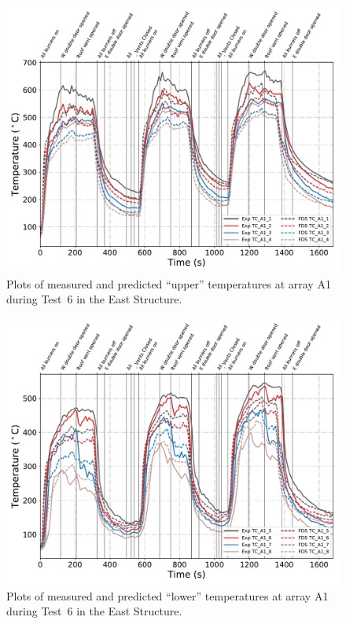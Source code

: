 \clearpage
\begin{figure}[p]
	\centering
	\includegraphics[width=\columnwidth]{Figures/Plots/Validation/Temperature/Test_6_TC_A1_upper}
	\caption{Plots of measured and predicted ``upper'' temperatures at array A1 during Test~6 in the East Structure.}
	\label{fig:TCA1_upper_data_Test6}
\end{figure}
\begin{figure}[p]
	\centering
	\includegraphics[width=\columnwidth]{Figures/Plots/Validation/Temperature/Test_6_TC_A1_lower}
	\caption{Plots of measured and predicted ``lower'' temperatures at array A1 during Test~6 in the East Structure.}
	\label{fig:TCA1_lower_data_Test6}
\end{figure}

